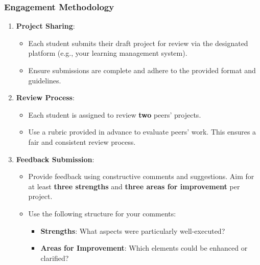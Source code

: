 \documentclass{beamer}
\begin{document}
\begin{frame}[fragile]
    \frametitle{Engagement Methodology}
    \begin{enumerate}
        \item \textbf{Project Sharing}:
        \begin{itemize}
            \item Each student submits their draft project for review via the designated platform (e.g., your learning management system).
            \item Ensure submissions are complete and adhere to the provided format and guidelines.
        \end{itemize}
        
        \item \textbf{Review Process}:
        \begin{itemize}
            \item Each student is assigned to review \textbf{two} peers' projects.
            \item Use a rubric provided in advance to evaluate peers’ work. This ensures a fair and consistent review process.
        \end{itemize}
        
        \item \textbf{Feedback Submission}:
        \begin{itemize}
            \item Provide feedback using constructive comments and suggestions. Aim for at least \textbf{three strengths} and \textbf{three areas for improvement} per project.
            \item Use the following structure for your comments:
            \begin{itemize}
                \item \textbf{Strengths}: What aspects were particularly well-executed?
                \item \textbf{Areas for Improvement}: Which elements could be enhanced or clarified?
            \end{itemize}
        \end{itemize}
        
    \end{enumerate}
\end{frame}
\end{document}
